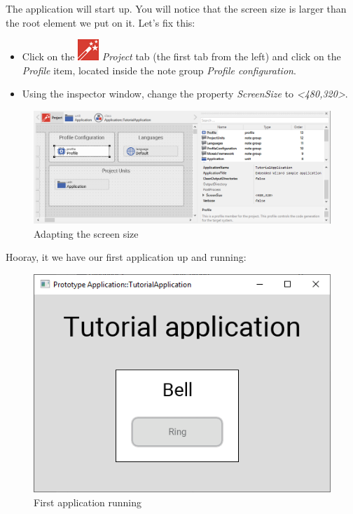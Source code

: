 \documentclass[
  a4paper,
,tablecaptionabove
]{scrbook}
\begin{document}
The application will start up. You will notice that the screen size is
larger than the root element we put on it. Let's fix this:

\begin{itemize}
\item
  Click on the
  \includegraphics{./../asciidoc/modules/ROOT/assets/images/icons/EmbeddedWizardIcon.png}
  \emph{Project} tab (the first tab from the left) and click on the
  \emph{Profile} item, located inside the note group \emph{Profile
  configuration}.
\item
  Using the inspector window, change the property \emph{ScreenSize} to
  \emph{\textless480,320\textgreater{}}.
\end{itemize}

\begin{figure}
\centering
\includegraphics{./../asciidoc/modules/ROOT/assets/images/firstcomponent/AdaptingScreenSize.png}
\caption{Adapting the screen size}
\end{figure}

Hooray, it we have our first application up and running:

\begin{figure}
\centering
\includegraphics{./../asciidoc/modules/ROOT/assets/images/firstcomponent/TutorialApplicationRunning.png}
\caption{First application running}
\end{figure}
\end{document}
